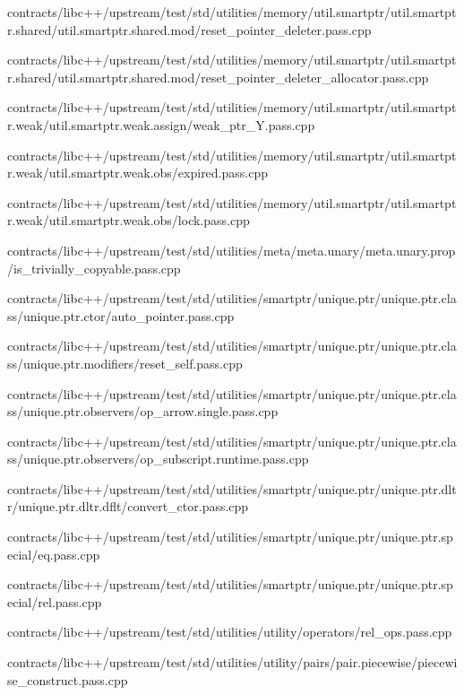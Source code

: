 \begin{DoxyCompactItemize}
contracts/libc++/upstream/test/std/utilities/memory/util.\+smartptr/util.\+smartptr.\+shared/util.\+smartptr.\+shared.\+mod/reset\+\_\+pointer\+\_\+deleter.\+pass.\+cpp\item 
contracts/libc++/upstream/test/std/utilities/memory/util.\+smartptr/util.\+smartptr.\+shared/util.\+smartptr.\+shared.\+mod/reset\+\_\+pointer\+\_\+deleter\+\_\+allocator.\+pass.\+cpp\item 
contracts/libc++/upstream/test/std/utilities/memory/util.\+smartptr/util.\+smartptr.\+weak/util.\+smartptr.\+weak.\+assign/weak\+\_\+ptr\+\_\+\+Y.\+pass.\+cpp\item 
contracts/libc++/upstream/test/std/utilities/memory/util.\+smartptr/util.\+smartptr.\+weak/util.\+smartptr.\+weak.\+obs/expired.\+pass.\+cpp\item 
contracts/libc++/upstream/test/std/utilities/memory/util.\+smartptr/util.\+smartptr.\+weak/util.\+smartptr.\+weak.\+obs/lock.\+pass.\+cpp\item 
contracts/libc++/upstream/test/std/utilities/meta/meta.\+unary/meta.\+unary.\+prop/is\+\_\+trivially\+\_\+copyable.\+pass.\+cpp\item 
contracts/libc++/upstream/test/std/utilities/smartptr/unique.\+ptr/unique.\+ptr.\+class/unique.\+ptr.\+ctor/auto\+\_\+pointer.\+pass.\+cpp\item 
contracts/libc++/upstream/test/std/utilities/smartptr/unique.\+ptr/unique.\+ptr.\+class/unique.\+ptr.\+modifiers/reset\+\_\+self.\+pass.\+cpp\item 
contracts/libc++/upstream/test/std/utilities/smartptr/unique.\+ptr/unique.\+ptr.\+class/unique.\+ptr.\+observers/op\+\_\+arrow.\+single.\+pass.\+cpp\item 
contracts/libc++/upstream/test/std/utilities/smartptr/unique.\+ptr/unique.\+ptr.\+class/unique.\+ptr.\+observers/op\+\_\+subscript.\+runtime.\+pass.\+cpp\item 
contracts/libc++/upstream/test/std/utilities/smartptr/unique.\+ptr/unique.\+ptr.\+dltr/unique.\+ptr.\+dltr.\+dflt/convert\+\_\+ctor.\+pass.\+cpp\item 
contracts/libc++/upstream/test/std/utilities/smartptr/unique.\+ptr/unique.\+ptr.\+special/eq.\+pass.\+cpp\item 
contracts/libc++/upstream/test/std/utilities/smartptr/unique.\+ptr/unique.\+ptr.\+special/rel.\+pass.\+cpp\item 
contracts/libc++/upstream/test/std/utilities/utility/operators/rel\+\_\+ops.\+pass.\+cpp\item 
contracts/libc++/upstream/test/std/utilities/utility/pairs/pair.\+piecewise/piecewise\+\_\+construct.\+pass.\+cpp\item 

\end{DoxyCompactItemize}

